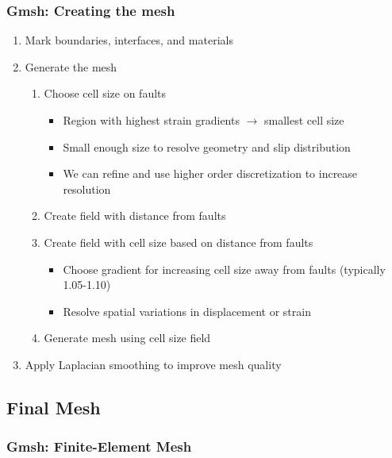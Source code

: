 \documentclass[aspectratio=169]{beamer}
\begin{document}
\begin{frame}
  \frametitle{Gmsh: Creating the mesh}
  
  \begin{enumerate}
  \item Mark boundaries, interfaces, and materials\pause
  \item Generate the mesh\pause
    \begin{enumerate}
    \item Choose cell size on faults
      \begin{itemize}
      \item Region with highest strain gradients $\rightarrow$ smallest cell size
      \item Small enough size to resolve geometry and slip distribution
      \item We can refine and use higher order discretization to increase resolution
      \end{itemize}\pause
    \item Create field with distance from faults\pause
    \item Create field with cell size based on distance from faults
      \begin{itemize}
      \item Choose gradient for increasing cell size away from faults (typically 1.05-1.10)
      \item Resolve spatial variations in displacement or strain
      \end{itemize}\pause
    \item Generate mesh using cell size field
    \end{enumerate}\pause
  \item Apply Laplacian smoothing to improve mesh quality
  \end{enumerate}
  
\end{frame}


\subsection{Final Mesh}

\begin{frame}
  \frametitle{Gmsh: Finite-Element Mesh}

  
\end{frame}
\end{document}
